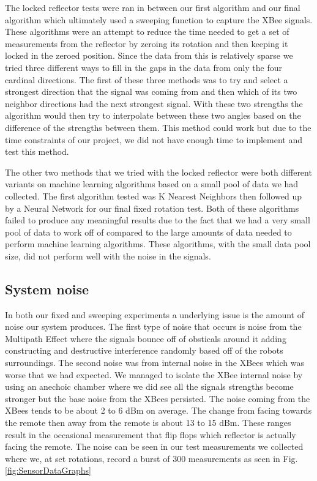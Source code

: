 The locked reflector tests were ran in between our first algorithm and our final algorithm which ultimately used a sweeping function to capture the XBee signals. These algorithms were an attempt to reduce the time needed to get a set of measurements from the reflector by zeroing its rotation and then keeping it locked in the zeroed position. Since the data from this is relatively sparse we tried three different ways to fill in the gaps in the data from only the four cardinal directions. The first of these three methods was to try and select a strongest direction that the signal was coming from and then which of its two neighbor directions had the next strongest signal. With these two strengths the algorithm would then try to interpolate between these two angles based on the difference of the strengths between them. This method could work but due to the time constraints of our project, we did not have enough time to implement and test this method.

\vspace*{12pt}
\noindent
The other two methods that we tried with the locked reflector were both different variants on machine learning algorithms based on a small pool of data we had collected. The first algorithm tested was K Nearest Neighbors then followed up by a Neural Network for our final fixed rotation test. Both of these algorithms failed to produce any meaningful results due to the fact that we had a very small pool of data to work off of compared to the large amounts of data needed to perform machine learning algorithms. These algorithms, with the small data pool size, did not perform well with the noise in the signals.

\subsection{System noise}

In both our fixed and sweeping experiments a underlying issue is the amount of noise our system produces. The first type of noise that occurs is noise from the Multipath Effect where the signals bounce off of obsticals around it adding constructing and destructive interference randomly based off of the robots surroundings. The second noise was from internal noise in the XBees which was worse that we had expected. We managed to isolate the XBee internal noise by using an anechoic chamber where we did see all the signals strengths become stronger but the base noise from the XBees persisted. The noise coming from the XBees tends to be about 2 to 6 dBm on average. The change from facing towards the remote then away from the remote is about 13 to 15 dBm. These ranges result in the occasional measurement that flip flops which reflector is actually facing the remote. The noise can be seen in our test measurements we collected where we, at set rotations, record a burst of 300 measurements as seen in Fig. \ref{fig:SensorDataGraphs}

